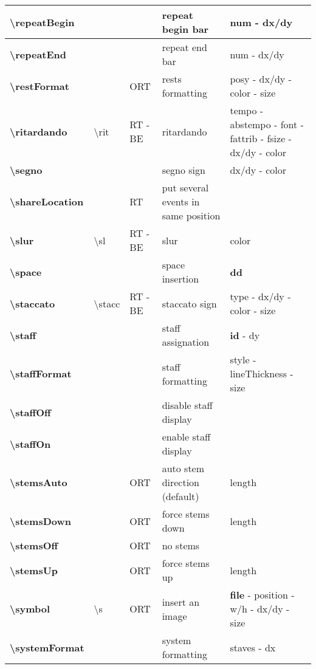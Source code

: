 \documentclass[a4paper, landscape, 10pt]{article}
\begin{document}
\begin{tabularx}{\linewidth}{p{3cm}p{4.5cm}p{3cm}p{5.5cm}l}
    \hline
    \textbf{\textbackslash{}repeatBegin}&&&repeat begin bar&num - dx/dy\\
    \hline
    \textbf{\textbackslash{}repeatEnd}&&&repeat end bar&num - dx/dy\\
    \hline
    \textbf{\textbackslash{}restFormat}&&ORT&rests formatting&posy - dx/dy - color - size\\
    \hline
    \textbf{\textbackslash{}ritardando}&\textbackslash{}rit&RT - BE&ritardando&tempo - abstempo - font - fattrib - fsize - dx/dy - color\\
    \hline
    \textbf{\textbackslash{}segno}&&&segno sign&dx/dy - color\\
    \hline
    \textbf{\textbackslash{}shareLocation}&&RT&put several events in same position&\\
    \hline
    \textbf{\textbackslash{}slur}&\textbackslash{}sl&RT - BE&slur&color\\
    \hline
    \textbf{\textbackslash{}space}&&&space insertion&\textbf{dd}\\
    \hline
    \textbf{\textbackslash{}staccato}&\textbackslash{}stacc&RT - BE&staccato sign&type - dx/dy - color - size\\
    \hline
    \textbf{\textbackslash{}staff}&&&staff assignation&\textbf{id} - dy\\
    \hline
    \textbf{\textbackslash{}staffFormat}&&&staff formatting&style - lineThickness - size\\
    \hline
    \textbf{\textbackslash{}staffOff}&&&disable staff display&\\
    \hline
    \textbf{\textbackslash{}staffOn}&&&enable staff display&\\
    \hline
    \textbf{\textbackslash{}stemsAuto}&&ORT&auto stem direction (default)&length\\
    \hline
    \textbf{\textbackslash{}stemsDown}&&ORT&force stems down&length\\
	\hline
    \textbf{\textbackslash{}stemsOff}&&ORT&no stems&\\
    \hline
    \textbf{\textbackslash{}stemsUp}&&ORT&force stems up&length\\
    \hline
    \textbf{\textbackslash{}symbol}&\textbackslash{}s&ORT&insert an image&\textbf{file} - position - w/h - dx/dy - size\\
    \hline
    \textbf{\textbackslash{}systemFormat}&&&system formatting&staves - dx\\ %

\end{tabularx}
\end{document}
